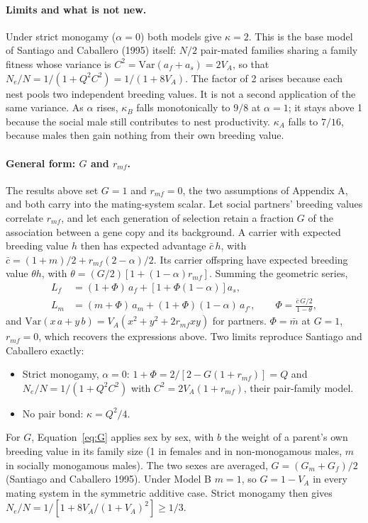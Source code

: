 \documentclass[12pt]{article}
\begin{document}
\paragraph{Limits and what is not new.} Under strict monogamy ($\alpha = 0$) both models give $\kappa = 2$. This is the base model of Santiago and Caballero (1995) itself: $N/2$ pair-mated families sharing a family fitness whose variance is $C^2 = \mathrm{Var}(a_f + a_s) = 2V_A$, so that $N_e/N = 1/(1 + Q^2 C^2) = 1/(1 + 8V_A)$. The factor of 2 arises because each nest pools two independent breeding values. It is not a second application of the same variance. As $\alpha$ rises, $\kappa_B$ falls monotonically to $9/8$ at $\alpha = 1$; it stays above 1 because the social male still contributes to nest productivity. $\kappa_A$ falls to $7/16$, because males then gain nothing from their own breeding value.

\paragraph{General form: $G$ and $r_{mf}$.} The results above set $G = 1$ and $r_{mf} = 0$, the two assumptions of Appendix A, and both carry into the mating-system scalar. Let social partners' breeding values correlate $r_{mf}$, and let each generation of selection retain a fraction $G$ of the association between a gene copy and its background. A carrier with expected breeding value $h$ then has expected advantage $\bar{c}\,h$, with $\bar{c} = (1+m)/2 + r_{mf}(2-\alpha)/2$. Its carrier offspring have expected breeding value $\theta h$, with $\theta = (G/2)\left[1 + (1-\alpha)r_{mf}\right]$. Summing the geometric series,
\begin{align}
    L_f &= (1+\Phi)\,a_f + \left[1 + \Phi(1-\alpha)\right] a_s, \\
    L_m &= (m+\Phi)\,a_m + (1+\Phi)(1-\alpha)\,a_{f'}, \qquad \Phi = \frac{\bar{c}\,G/2}{1-\theta},
\end{align}
and $\mathrm{Var}(x\,a + y\,b) = V_A(x^2 + y^2 + 2r_{mf}xy)$ for partners. $\Phi = \bar{m}$ at $G = 1$, $r_{mf} = 0$, which recovers the expressions above. Two limits reproduce Santiago and Caballero exactly:
\begin{itemize}
    \item Strict monogamy, $\alpha = 0$: $1 + \Phi = 2/[2 - G(1+r_{mf})] = Q$ and $N_e/N = 1/(1 + Q^2C^2)$ with $C^2 = 2V_A(1+r_{mf})$, their pair-family model.
    \item No pair bond: $\kappa = Q^2/4$.
\end{itemize}
For $G$, Equation~\eqref{eq:G} applies sex by sex, with $b$ the weight of a parent's own breeding value in its family size (1 in females and in non-monogamous males, $m$ in socially monogamous males). The two sexes are averaged, $G = (G_m + G_f)/2$ (Santiago and Caballero 1995). Under Model B $m = 1$, so $G = 1 - V_A$ in every mating system in the symmetric additive case. Strict monogamy then gives $N_e/N = 1/[1 + 8V_A/(1+V_A)^2] \ge 1/3$.
\end{document}
